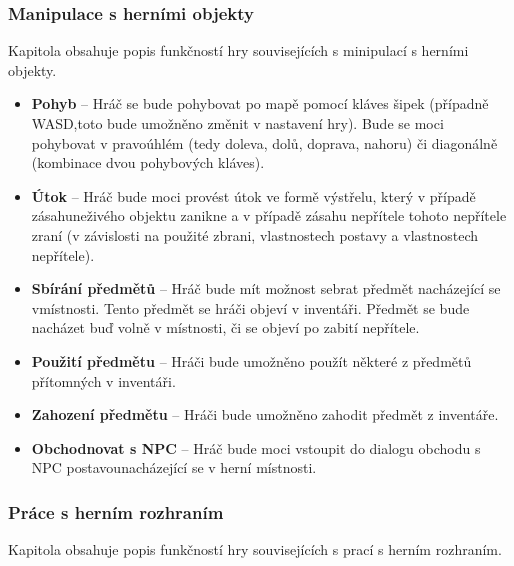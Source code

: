 \documentclass[12pt,a4paper]{article}
\begin{document}
\subsubsection{Manipulace s herními objekty}

Kapitola obsahuje popis funkčností hry souvisejících s minipulací s herními
objekty.

\begin {itemize}
\item{\textbf{Pohyb} --  Hráč se bude pohybovat po mapě pomocí kláves šipek
  (případně WASD,toto bude umožněno změnit v nastavení hry). Bude se moci
  pohybovat v pravoúhlém (tedy doleva, dolů, doprava, nahoru) či diagonálně
  (kombinace dvou pohybových kláves).}
\item{\textbf{Útok} --  Hráč bude moci provést útok ve formě výstřelu, který v
  případě zásahuneživého objektu zanikne a v případě zásahu nepřítele tohoto
  nepřítele zraní (v závislosti na použité zbrani, vlastnostech postavy a
  vlastnostech nepřítele).}
\item{\textbf{Sbírání předmětů} --  Hráč bude mít možnost sebrat předmět
  nacházející se vmístnosti. Tento předmět se hráči objeví v inventáři. Předmět
  se bude nacházet buď volně v místnosti, či se objeví po zabití nepřítele.}
\item{\textbf{Použití předmětu} --  Hráči bude umožněno použít některé z
  předmětů přítomných v inventáři.}
\item{\textbf{Zahození předmětu} --  Hráči bude umožněno zahodit předmět z
  inventáře.}
\item{\textbf{Obchodnovat s NPC} --  Hráč bude moci vstoupit do dialogu obchodu
  s NPC postavounacházející se v herní místnosti.}
\end {itemize}

\subsubsection{Práce s herním rozhraním}

Kapitola obsahuje popis funkčností hry
souvisejících s prací s herním rozhraním.
\end{document}
